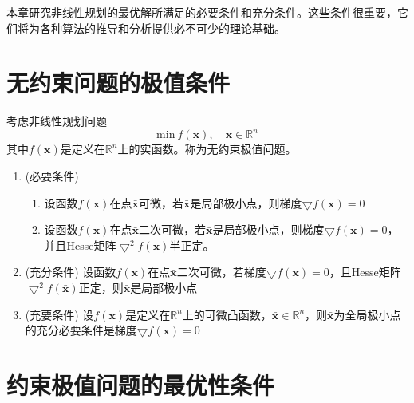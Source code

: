 本章研究非线性规划的最优解所满足的必要条件和充分条件。这些条件很重要，它们将为各种算法的推导和分析提供必不可少的理论基础。
\section{无约束问题的极值条件}
考虑非线性规划问题
\begin{equation}
	\mathrm{min}\ f(\boldsymbol{x}),\quad  \boldsymbol{x}\in \mathbb{R}^n
\end{equation}
其中$f(\boldsymbol{x})$是定义在$\mathbb{R}^n$上的实函数。称为无约束极值问题。

\begin{theorem}{}{}
	\begin{enumerate}
		\item (必要条件)
		\begin{enumerate}
			\item 设函数$f(\boldsymbol{x})$在点$\bar{\boldsymbol{x}}$可微，若$\bar{\boldsymbol{x}}$是局部极小点，则梯度$\bigtriangledown f(\boldsymbol{x})=0$
			\item 设函数$f(\boldsymbol{x})$在点$\bar{\boldsymbol{x}}$二次可微，若$\bar{\boldsymbol{x}}$是局部极小点，则梯度$\bigtriangledown f(\boldsymbol{x})=0$，并且Hesse矩阵$\bigtriangledown^2f(\bar{\boldsymbol{x}})$半正定。
		\end{enumerate}
		 
		\item (充分条件) 
		设函数$f(\boldsymbol{x})$在点$\bar{\boldsymbol{x}}$二次可微，若梯度$\bigtriangledown f(\boldsymbol{x})=0$，且Hesse矩阵$\bigtriangledown^2f(\bar{\boldsymbol{x}})$正定，则$\bar{\boldsymbol{x}}$是局部极小点
		\item (充要条件)
		设$f(\boldsymbol{x})$是定义在$\mathbb{R}^n$上的可微凸函数，$\bar{\boldsymbol{x}}\in \mathbb{R}^n$，则$\bar{\boldsymbol{x}}$为全局极小点的充分必要条件是梯度$\bigtriangledown f(\boldsymbol{x})=0$
	\end{enumerate}
	
\end{theorem}
\section{约束极值问题的最优性条件}